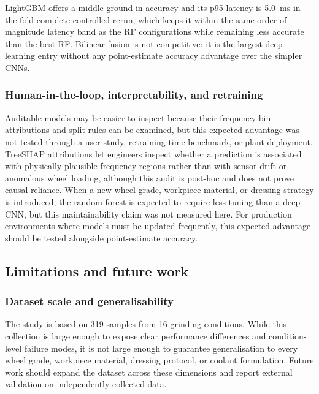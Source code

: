 LightGBM offers a middle ground in accuracy and its p95 latency is
5.0~ms in the fold-complete controlled rerun, which keeps it within the same
order-of-magnitude latency band as the RF configurations while remaining
less accurate than the best RF. Bilinear fusion is not competitive: it is the largest deep-learning entry without any
point-estimate accuracy advantage over the simpler CNNs.

\subsubsection{Human-in-the-loop, interpretability, and
retraining}\label{human-in-the-loop}

Auditable models may be easier to inspect because their frequency-bin attributions and split rules can be examined, but this expected advantage was not tested through a user study, retraining-time benchmark, or plant deployment. TreeSHAP attributions let engineers inspect whether a
prediction is associated with physically plausible frequency regions
rather than with sensor drift or anomalous wheel loading, although this
audit is post-hoc and does not prove causal reliance. When a new wheel
grade, workpiece material, or dressing strategy is introduced, the random
forest is expected to require less tuning than a deep CNN, but this
maintainability claim was not measured here. For production environments
where models must be updated frequently, this expected advantage should be
tested alongside point-estimate accuracy.

\subsection{Limitations and future
work}\label{limitations-and-future-work}

\subsubsection{Dataset scale and
generalisability}\label{scale-and-generalisability}

The study is based on 319 samples from 16 grinding conditions. While this
collection is large enough to expose clear performance differences and
condition-level failure modes, it is not large enough to guarantee
generalisation to every wheel grade, workpiece material, dressing protocol,
or coolant formulation. Future work should expand the dataset across these
dimensions and report external validation on independently collected data.

